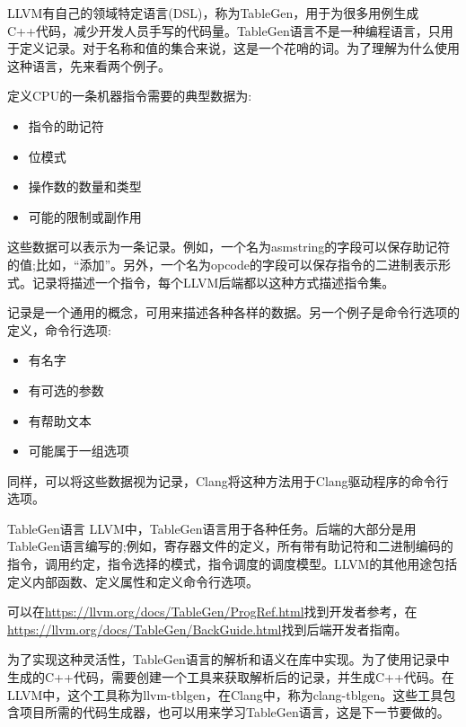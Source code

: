 LLVM有自己的领域特定语言(DSL)，称为TableGen，用于为很多用例生成C++代码，减少开发人员手写的代码量。TableGen语言不是一种编程语言，只用于定义记录。对于名称和值的集合来说，这是一个花哨的词。为了理解为什么使用这种语言，先来看两个例子。

定义CPU的一条机器指令需要的典型数据为:

\begin{itemize}
\item
指令的助记符

\item
位模式

\item
操作数的数量和类型

\item
可能的限制或副作用
\end{itemize}

这些数据可以表示为一条记录。例如，一个名为asmstring的字段可以保存助记符的值;比如，“添加”。另外，一个名为opcode的字段可以保存指令的二进制表示形式。记录将描述一个指令，每个LLVM后端都以这种方式描述指令集。

记录是一个通用的概念，可用来描述各种各样的数据。另一个例子是命令行选项的定义，命令行选项:

\begin{itemize}
\item
有名字

\item
有可选的参数

\item
有帮助文本

\item
可能属于一组选项
\end{itemize}

同样，可以将这些数据视为记录，Clang将这种方法用于Clang驱动程序的命令行选项。

\begin{myTip}{TableGen语言}
LLVM中，TableGen语言用于各种任务。后端的大部分是用TableGen语言编写的;例如，寄存器文件的定义，所有带有助记符和二进制编码的指令，调用约定，指令选择的模式，指令调度的调度模型。LLVM的其他用途包括定义内部函数、定义属性和定义命令行选项。

可以在\url{https://llvm.org/docs/TableGen/ProgRef.html}找到开发者参考，在\url{https://llvm.org/docs/TableGen/BackGuide.html}找到后端开发者指南。
\end{myTip}

为了实现这种灵活性，TableGen语言的解析和语义在库中实现。为了使用记录中生成的C++代码，需要创建一个工具来获取解析后的记录，并生成C++代码。在LLVM中，这个工具称为llvm-tblgen，在Clang中，称为clang-tblgen。这些工具包含项目所需的代码生成器，也可以用来学习TableGen语言，这是下一节要做的。































